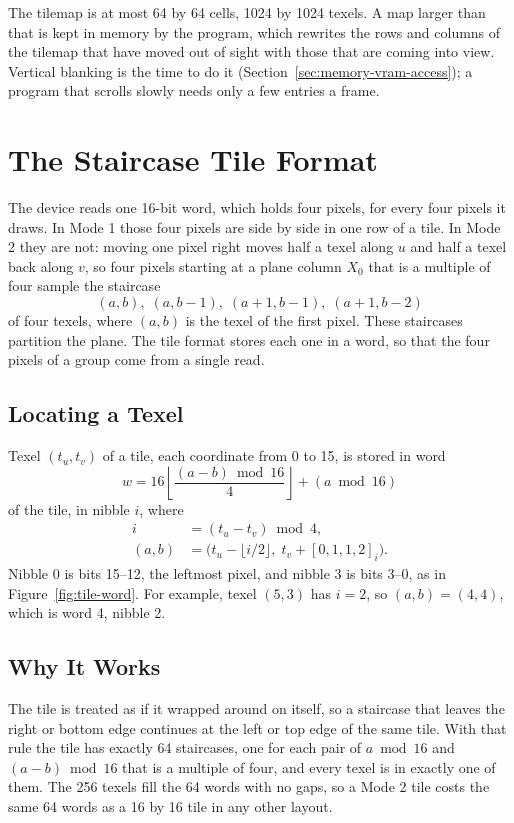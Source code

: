 The tilemap is at most 64 by 64 cells, 1024 by 1024 texels. A map larger than that is kept in memory by the program,
which rewrites the rows and columns of the tilemap that have moved out of sight with those that are coming into view.
Vertical blanking is the time to do it (Section~\ref{sec:memory-vram-access}); a program that scrolls slowly needs only
a few entries a frame.

\section{The Staircase Tile Format}
\label{sec:m2-tile-format}

The device reads one 16-bit word, which holds four pixels, for every four pixels it draws. In Mode 1 those four pixels
are side by side in one row of a tile. In Mode 2 they are not: moving one pixel right moves half a texel along $u$ and
half a texel back along $v$, so four pixels starting at a plane column $X_0$ that is a multiple of four sample the
staircase
\[
	(a, b),\; (a, b - 1),\; (a + 1, b - 1),\; (a + 1, b - 2)
\]
of four texels, where $(a, b)$ is the texel of the first pixel. These staircases partition the plane. The tile format
stores each one in a word, so that the four pixels of a group come from a single read.

\subsection{Locating a Texel}

Texel $(t_u, t_v)$ of a tile, each coordinate from 0 to 15, is stored in word
\[
	w = 16 \left\lfloor \frac{(a - b) \bmod 16}{4} \right\rfloor + (a \bmod 16)
\]
of the tile, in nibble $i$, where
\begin{align*}
	i      & = (t_u - t_v) \bmod 4,                                             \\
	(a, b) & = \bigl(t_u - \lfloor i / 2 \rfloor,\; t_v + [0, 1, 1, 2]_i\bigr).
\end{align*}
Nibble 0 is bits 15--12, the leftmost pixel, and nibble 3 is bits 3--0, as in Figure~\ref{fig:tile-word}. For example, texel $(5, 3)$
has $i = 2$, so $(a, b) = (4, 4)$, which is word 4, nibble 2.

\subsection{Why It Works}

The tile is treated as if it wrapped around on itself, so a staircase that leaves the right or bottom edge continues at
the left or top edge of the same tile. With that rule the tile has exactly 64 staircases, one for each pair of $a \bmod
	16$ and $(a - b) \bmod 16$ that is a multiple of four, and every texel is in exactly one of them. The 256 texels fill
the 64 words with no gaps, so a Mode 2 tile costs the same 64 words as a 16 by 16 tile in any other layout.


